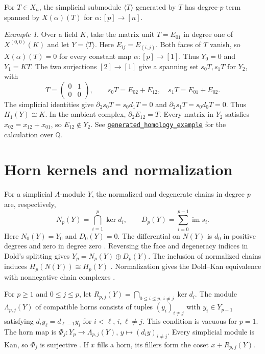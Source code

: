 \documentclass[11pt]{article}
\theoremstyle{definition}
\theoremstyle{remark}
\newtheorem{example}[theorem]{Example}
\DeclareMathOperator{\im}{im}
\newcommand{\program}[2]{\href{https://github.com/flengyel/SimplicialTensors/blob/c6802c6692215b688864dc18cd9ff3073b804d71/#1}{\nolinkurl{#2}}}
\begin{document}
For $T\in X_n$, the simplicial submodule $\langle T\rangle$ generated by
$T$ has degree-$p$ term spanned by $X(\alpha)(T)$ for $\alpha:[p]\to[n]$.

\begin{example}\label{ex:matrix-cycle}
Over a field $K$, take the matrix unit $T=E_{01}$ in degree one of $X^{(0,0)}(K)$
and let $Y=\langle T\rangle$. Here $E_{ij}=E_{(i,j)}$. Both faces of $T$ vanish,
so $X(\alpha)(T)=0$ for every constant map $\alpha:[p]\to[1]$. Thus $Y_0=0$ and $Y_1=KT$.
The two surjections $[2]\to[1]$ give a spanning set $s_0T,s_1T$ for $Y_2$, with
\[
 T=\begin{pmatrix}0&1\\0&0\end{pmatrix},\qquad
 s_0T=E_{02}+E_{12},\quad s_1T=E_{01}+E_{02}.
\]
The simplicial identities give $\partial_2s_0T=s_0d_1T=0$ and $\partial_2s_1T=s_0d_0T=0$.
Thus $H_1(Y)\cong K$. In the ambient complex, $\partial_2E_{12}=T$.
Every matrix in $Y_2$ satisfies $x_{02}=x_{12}+x_{01}$, so $E_{12}\notin Y_2$.
See \program{tex/anc/dstm_examples.py\#L54}{generated_homology_example} for the calculation over $\mathbb Q$.
\end{example}

\section{Horn kernels and normalization}\label{sec:horn-kernels}
For a simplicial $A$-module $Y$, the normalized and degenerate chains in
degree $p$ are, respectively,
\[
 N_p(Y)=\bigcap_{i=1}^p\ker d_i,\qquad
 D_p(Y)=\sum_{i=0}^{p-1}\im s_i.
\]
Here $N_0(Y)=Y_0$ and $D_0(Y)=0$. The differential on $N(Y)$ is
$d_0$ in positive degrees and zero in degree zero
\cite[Exercise 8.3.4]{Weibel}. Reversing the face and degeneracy indices
in Dold's splitting \cite[Corollary 1.12]{Dold1958} gives
$Y_p=N_p(Y)\oplus D_p(Y)$. The inclusion of normalized chains
induces $H_p(N(Y))\cong H_p(Y)$ \cite[Theorem 8.3.8]{Weibel}.
Normalization gives the Dold--Kan equivalence with nonnegative chain
complexes \cite[Theorem 8.4.1]{Weibel}.

For $p\geq1$ and $0\leq j\leq p$, let $R_{p,j}(Y)=
\bigcap_{0\leq i\leq p,\ i\ne j}\ker d_i$.
The module $\Lambda_{p,j}(Y)$ of compatible horns consists of tuples
$(y_i)_{i\ne j}$ with $y_i\in Y_{p-1}$ satisfying $d_i y_\ell=d_{\ell-1}y_i$
for $i<\ell$, $i,\ell\ne j$. This condition is vacuous for $p=1$.
The horn map is
$\Phi_j:Y_p\to\Lambda_{p,j}(Y)$, $y\mapsto(d_i y)_{i\ne j}$.
Every simplicial module is Kan, so $\Phi_j$ is surjective
\cite[Lemma 8.2.8]{Weibel}. If $x$ fills a horn, its fillers form the
coset $x+R_{p,j}(Y)$.
\end{document}
